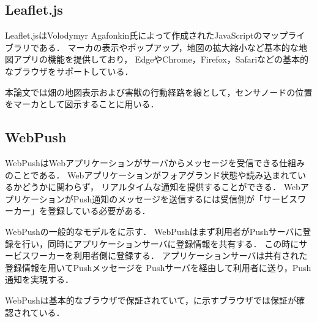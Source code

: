 \documentclass[12pt]{honka_v1}
\begin{document}
\subsection{Leaflet.js}
Leaflet.jsはVolodymyr Agafonkin氏によって作成されたJavaScriptのマップライブラリである．
マーカの表示やポップアップ，地図の拡大縮小など基本的な地図アプリの機能を提供しており，
EdgeやChrome，Firefox，Safariなどの基本的なブラウザをサポートしている\cite{bib:leafletjs-web}．

本論文では畑の地図表示および害獣の行動経路を線として，センサノードの位置をマーカとして図示することに用いる．

\subsection{WebPush}
WebPushはWebアプリケーションがサーバからメッセージを受信できる仕組みのことである．
Webアプリケーションがフォアグランド状態や読み込まれているかどうかに関わらず，
リアルタイムな通知を提供することができる．
WebアプリケーションがPush通知のメッセージを送信するには受信側が「サービスワーカー」を登録している必要がある\cite{bib:pushapi-web}．

WebPushの一般的なモデルをに示す．
WebPushはまず利用者がPushサーバに登録を行い，同時にアプリケーションサーバに登録情報を共有する．
この時にサービスワーカーを利用者側に登録する．
アプリケーションサーバは共有された登録情報を用いてPushメッセージを
Pushサーバを経由して利用者に送り，Push通知を実現する\cite{bib:webpush-rfc}．


WebPushは基本的なブラウザで保証されていて，に示すブラウザでは保証が確認されている\cite{bib:pushapi-web}．
\end{document}
